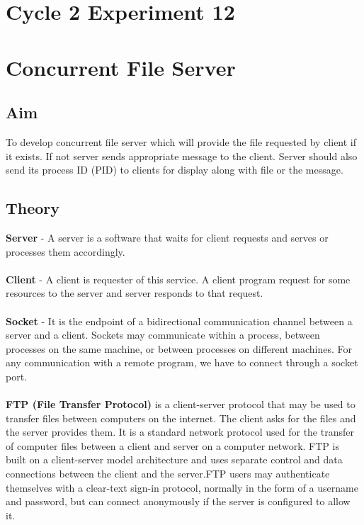 \section*{Cycle 2 Experiment 12}

\section{\Large{Concurrent File Server}}

\subsection{Aim}
\large To develop concurrent file server which will provide the file requested by client if it exists. If not server sends appropriate message to the client. Server should also send its process ID (PID) to clients for display along with file or the message.

\subsection{Theory}
\textbf{Server} - A server is a software that waits for client requests and serves or processes
them accordingly.\\ \\
\textbf{Client} - A client is requester of this service. A client program request for some
resources to the server and server responds to that request.\\ \\
\textbf{Socket} - It is the endpoint of a bidirectional communication channel between a server and a client. Sockets may communicate within a process, between processes on the same machine, or between processes on different machines. For any communication with a remote program, we have to connect through a socket port.\\ \\
\textbf{FTP (File Transfer Protocol)} is a client-server protocol that may be used to transfer files between computers on the internet. The client asks for the files and the server provides them. It is a standard network protocol used for the transfer of computer files between a client and server on a computer network. FTP is built on a client-server model architecture and uses separate control and data connections between the client and the server.FTP users may authenticate themselves with a clear-text sign-in protocol, normally in the form of a username and password, but can connect anonymously if the server is configured to allow it.
